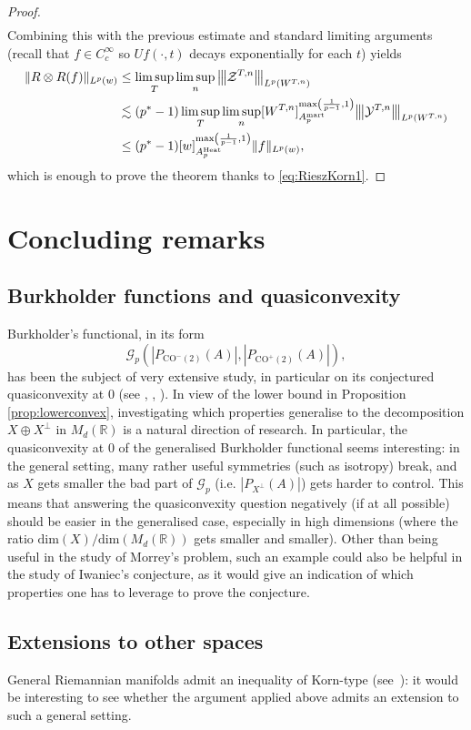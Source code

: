 \documentclass[11pt, a4paper]{amsart}
\theoremstyle{definition}
\theoremstyle{remark}
\newcommand{\R}{\mathbb{R}}
\newcommand{\vvvert}[1]{
    {\left\vert\kern-0.25ex\left\vert\kern-
    0.25ex\left\vert #1 
    \right\vert\kern-0.25ex\right\vert\kern-
    0.25ex\right\vert}
}
\begin{document}
\begin{proof}
\begin{align*}
\end{align*}
Combining this with the previous estimate and standard limiting
arguments (recall that $f\in C^\infty_{c}$ so $U f(\cdot, t)$
decays exponentially for each $t$) yields
\begin{align*}
\|R\otimes R(f)\|_{L^p(w)}&\le
\limsup_T\limsup_n\vvvert{\mathcal Z^{T,n}}_{L^p(W^{T,n})}\\
&\lesssim (p^*-1)\limsup_T\limsup_n
[W^{T,n}]_{A_p^{\text{\upshape mart}}}^{\max\left(\frac{1}{p-1
},1\right)} \vvvert{\mathcal Y^{T,n}}_{L^p(W^{T,n})}\\
&\le (p^*-1)
[w]_{A_p^{\text{\upshape Heat}}}^{\max\left(\frac{1}{p-1
},1\right)} \|f\|_{L^p(w)},
\end{align*}
which is enough to prove the theorem
thanks to \eqref{eq:RieszKorn1}.
\end{proof}
\section{Concluding remarks}
\subsection{Burkholder functions and
quasiconvexity}
Burkholder's functional, in its form
\[\mathcal G_p(|P_{\mathrm{CO}^-(2)}(A)|,|P_{\mathrm{CO}^+(2)}(A)|),
\]
has been the subject of very extensive study, in particular
on its conjectured quasiconvexity at $0$ (see \cite{KariAstala2024}, \cite{Astala2023TheTheory}, \cite{Guerra2022}). In view of the lower bound in Proposition 
\ref{prop:lowerconvex}, investigating which properties
generalise to the decomposition
$X\oplus X^\perp$ in $M_d(\R)$ is a natural
direction of research.
In particular, the quasiconvexity
at $0$ of the generalised Burkholder functional
seems interesting: in the general setting, many 
rather useful symmetries (such as isotropy) break, and
as $X$ gets smaller the bad part of $\mathcal G_p$
(i.e. $|P_{X^\perp}(A)|$) gets harder to control.
This means that answering the quasiconvexity question
negatively (if at all possible) should be easier 
in the generalised case, especially in high dimensions
(where the ratio $\mathrm{dim}(X)/\mathrm{dim}(M_d(\R))$
gets smaller and smaller). Other than being
useful in the study of Morrey's problem, such an 
example could also be helpful in the study
of Iwaniec's conjecture, as it would 
give an indication of
which properties one has to leverage to prove the 
conjecture.
\subsection{Extensions to other spaces}
General Riemannian manifolds admit 
an inequality of Korn-type (see~\cite{ChenJost}):
it would be interesting to see whether
the argument applied above admits an extension to such a general
setting.
\end{document}
